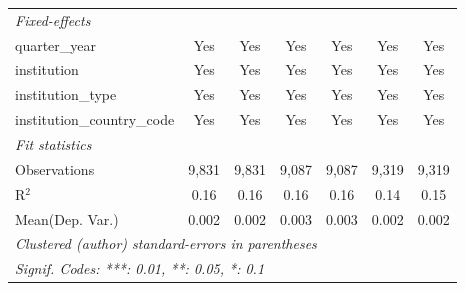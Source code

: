 \begin{tabular}{lcccccc}
   \midrule
   \emph{Fixed-effects}\\
   quarter\_year                      & Yes     & Yes            & Yes     & Yes       & Yes     & Yes\\  
   institution                        & Yes     & Yes            & Yes     & Yes       & Yes     & Yes\\  
   institution\_type                  & Yes     & Yes            & Yes     & Yes       & Yes     & Yes\\  
   institution\_country\_code         & Yes     & Yes            & Yes     & Yes       & Yes     & Yes\\  
   \midrule
   \emph{Fit statistics}\\
   Observations                       & 9,831   & 9,831          & 9,087   & 9,087     & 9,319   & 9,319\\  
   R$^2$                              & 0.16    & 0.16           & 0.16    & 0.16      & 0.14    & 0.15\\  
Mean(Dep. Var.) & 0.002 & 0.002 & 0.003 & 0.003 & 0.002 & 0.002 \\
   \midrule \midrule
   \multicolumn{7}{l}{\emph{Clustered (author) standard-errors in parentheses}}\\
   \multicolumn{7}{l}{\emph{Signif. Codes: ***: 0.01, **: 0.05, *: 0.1}}\\
\end{tabular}
\par\endgroup
